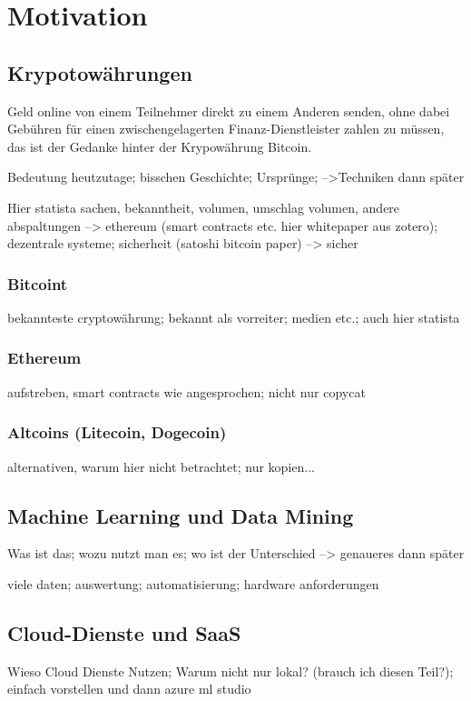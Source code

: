 \chapter{Motivation}


\section{Krypotowährungen}
Geld online von einem Teilnehmer direkt zu einem Anderen senden, ohne dabei Gebühren für einen zwischengelagerten Finanz-Dienstleister zahlen zu müssen, das ist der Gedanke hinter der Krypowährung Bitcoin.\citep{nakamoto_bitcoin:_2008}


Bedeutung heutzutage; bisschen Geschichte; Ursprünge; -->Techniken dann später

Hier statista sachen, bekanntheit, volumen, umschlag volumen, andere abspaltungen --> ethereum (smart contracts etc. hier whitepaper aus zotero);
dezentrale systeme; sicherheit (satoshi bitcoin paper) --> sicher


\subsection{Bitcoint}
bekannteste cryptowährung; bekannt als vorreiter; medien etc.; auch hier statista


\subsection{Ethereum}
aufstreben, smart contracts wie angesprochen; nicht nur copycat


\subsection{Altcoins (Litecoin, Dogecoin)}
alternativen, warum hier nicht betrachtet; nur kopien...




\section{Machine Learning und Data Mining}
Was ist das; wozu nutzt man es; wo ist der Unterschied --> genaueres dann später

viele daten; auswertung; automatisierung; hardware anforderungen


\section{Cloud-Dienste und SaaS}
Wieso Cloud Dienste Nutzen; Warum nicht nur lokal? (brauch ich diesen Teil?); einfach vorstellen und dann azure ml studio